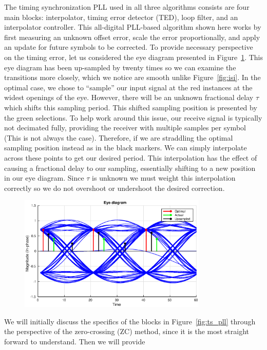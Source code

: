 \documentclass[letterpaper,12pt]{article}
\begin{document}
The timing synchronization PLL used in all three algorithms consists are four main blocks: interpolator, 
timing error detector (TED), loop filter, and an interpolator controller.  This all-digital PLL-based algorithm shown here works by first measuring an unknown offset error, scale the error proportionally, and apply an update 
for future symbols to be corrected. To provide necessary perspective on the timing error, let us considered 
the eye diagram presented in Figure~\ref{fig:eye_tm}.  This eye diagram has been up-sampled by twenty times so 
we can examine the transitions more closely, which we notice are smooth unlike Figure~\ref{fig:isi}.  In the optimal case, we chose to ``sample'' our input signal at the red instances at the widest openings of the eye.  However, there will be an unknown fractional delay $\tau$ which shifts this sampling period.  This shifted sampling position is 
presented by the green selections. To help work around this issue, our receive signal is typically not 
decimated fully, providing the receiver with multiple samples per symbol (This is not always the case). 
Therefore, if we are straddling the optimal sampling position instead as in the black markers.  We can simply 
interpolate across these points to get our desired period.  This interpolation has the effect of causing a 
fractional delay to our sampling, essentially shifting to a new position in our eye diagram. Since $\tau$ is 
unknown we must weight this interpolation correctly so we do not overshoot or undershoot the desired 
correction.\par
%
\begin{figure}
 \centering
 \includegraphics[width=0.8\textwidth]{eyeDiagram.eps}
\caption{}
\label{fig:eye_tm}
\end{figure} 
%
We will initially discuss the specifics of the blocks in Figure~\ref{fig:ts_pll} through the perspective of 
the zero-crossing (ZC) method, since it is the most straight forward to understand.  Then we will provide 
\end{document}

